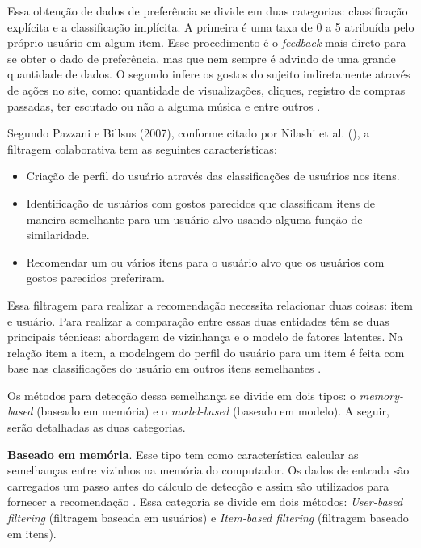 Essa obtenção de dados de preferência se divide em duas categorias: classificação explícita e a classificação implícita. A primeira é uma taxa de 0 a 5 atribuída pelo próprio usuário em algum item. Esse procedimento é o \textit{feedback} mais direto para se obter o dado de preferência, mas que nem sempre é advindo de uma grande quantidade de dados. O segundo infere os gostos do sujeito indiretamente através de ações no site, como: quantidade de visualizações, cliques, registro de compras passadas, ter escutado ou não a alguma música e entre outros \cite{luo:2018}.
	
Segundo Pazzani e Billsus (2007), conforme citado por Nilashi et al. (\citeyear{Nilashi:2013}), a filtragem colaborativa tem as seguintes características:

\begin{itemize}
    \item Criação de perfil do usuário através das classificações de usuários nos itens.
    \item Identificação de usuários com gostos parecidos que classificam itens de maneira semelhante para um usuário alvo usando alguma função de similaridade.
    \item Recomendar um ou vários itens para o usuário alvo que os usuários com gostos parecidos preferiram.

\end{itemize}

Essa filtragem para realizar a recomendação necessita relacionar duas coisas: item e usuário. Para realizar a comparação entre essas duas entidades têm se duas principais técnicas: abordagem de vizinhança e o modelo de fatores latentes. Na relação item a item, a modelagem do perfil do usuário para um item é feita com base nas classificações do usuário em outros itens semelhantes \cite{Koren:2015}.

Os métodos para detecção dessa semelhança se divide em dois tipos: o \textit{memory-based} (baseado em memória) e o \textit{model-based} (baseado em modelo). A seguir, serão detalhadas as duas categorias.


\textbf{Baseado em memória}. Esse tipo tem como característica calcular as semelhanças entre vizinhos na memória do computador. Os dados de entrada são carregados um passo antes do cálculo de detecção e assim são utilizados para fornecer a recomendação \cite{Levinas2014AnAO}. Essa categoria se divide em dois métodos: \textit{User-based filtering} (filtragem baseada em usuários) e \textit{Item-based filtering} (filtragem baseado em itens).

